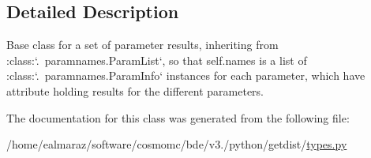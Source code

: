 \subsection{Detailed Description}
\begin{DoxyVerb}Base class for a set of parameter results, inheriting from :class:`.~paramnames.ParamList`, 
so that self.names is a list of :class:`.~paramnames.ParamInfo` instances for each parameter, which
have attribute holding results for the different parameters.
\end{DoxyVerb}
 

The documentation for this class was generated from the following file\+:\begin{DoxyCompactItemize}
\item 
/home/ealmaraz/software/cosmomc/bde/v3./python/getdist/\mbox{\hyperlink{types_8py}{types.\+py}}\end{DoxyCompactItemize}
